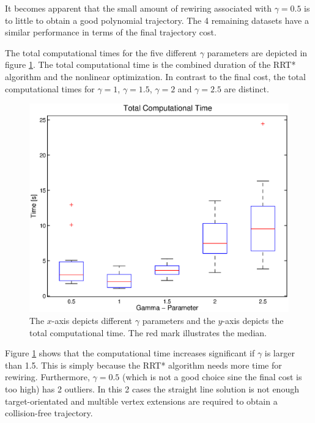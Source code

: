 It becomes apparent that the small amount of rewiring associated with $\gamma = 0.5$ is to little to obtain a good polynomial trajectory. The 4 remaining datasets have a similar performance in terms of the final trajectory cost. \newline

The total computational times for the five different $\gamma$ parameters are depicted in figure \ref{pic:boxplot_time}. The total computational time is the combined duration of the RRT* algorithm and the nonlinear optimization.  In contrast to the final cost, the total computational times for $\gamma = 1 $, $\gamma = 1.5$, $\gamma = 2$ and $\gamma = 2.5$ are distinct. 

\begin{figure}[H]
   \centering
   \includegraphics[trim = 14mm 10mm 15mm 0mm,clip,width=1\textwidth]{pics/boxplot_time.eps}
   \caption{The $x$-axis depicts different $\gamma$ parameters and the $y$-axis depicts the total computational time. The red mark illustrates the median.}
   \label{pic:boxplot_time}
\end{figure}

Figure \ref{pic:boxplot_time} shows that the computational time increases significant if $\gamma$ is larger than 1.5. This is simply because the RRT* algorithm needs more time for rewiring. Furthermore, $\gamma = 0.5$ (which is not a good choice sine the final cost is too high) has 2 outliers. In this 2 cases the straight line solution is not enough target-orientated and multible vertex extensions are required to obtain a collision-free trajectory. \newline

